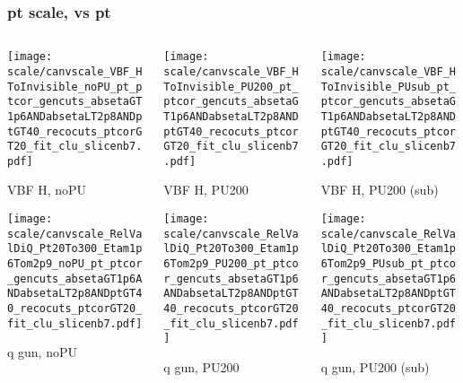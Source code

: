 \documentclass[8pt]{beamer}
\begin{document}
 \begin{frame}
  \frametitle{pt scale, vs pt}
  
  \begin{columns}
   \begin{column}{0.35\textwidth}
     \texttt{[image: scale/canvscale\_VBF\_HToInvisible\_noPU\_pt\_ptcor\_gencuts\_absetaGT1p6ANDabsetaLT2p8ANDptGT40\_recocuts\_ptcorGT20\_fit\_clu\_slicenb7.pdf]}
     
     VBF H, noPU
    
     \texttt{[image: scale/canvscale\_RelValDiQ\_Pt20To300\_Etam1p6Tom2p9\_noPU\_pt\_ptcor\_gencuts\_absetaGT1p6ANDabsetaLT2p8ANDptGT40\_recocuts\_ptcorGT20\_fit\_clu\_slicenb7.pdf]}
     
     q gun, noPU
   \end{column}
   \begin{column}{0.35\textwidth}
     \texttt{[image: scale/canvscale\_VBF\_HToInvisible\_PU200\_pt\_ptcor\_gencuts\_absetaGT1p6ANDabsetaLT2p8ANDptGT40\_recocuts\_ptcorGT20\_fit\_clu\_slicenb7.pdf]}
     
     VBF H, PU200
    
     \texttt{[image: scale/canvscale\_RelValDiQ\_Pt20To300\_Etam1p6Tom2p9\_PU200\_pt\_ptcor\_gencuts\_absetaGT1p6ANDabsetaLT2p8ANDptGT40\_recocuts\_ptcorGT20\_fit\_clu\_slicenb7.pdf]}
     
     q gun, PU200
   \end{column}
   \begin{column}{0.35\textwidth}
     \texttt{[image: scale/canvscale\_VBF\_HToInvisible\_PUsub\_pt\_ptcor\_gencuts\_absetaGT1p6ANDabsetaLT2p8ANDptGT40\_recocuts\_ptcorGT20\_fit\_clu\_slicenb7.pdf]}
     
     VBF H, PU200 (sub)
    
     \texttt{[image: scale/canvscale\_RelValDiQ\_Pt20To300\_Etam1p6Tom2p9\_PUsub\_pt\_ptcor\_gencuts\_absetaGT1p6ANDabsetaLT2p8ANDptGT40\_recocuts\_ptcorGT20\_fit\_clu\_slicenb7.pdf]}
     
     q gun, PU200 (sub)
   \end{column}
  \end{columns}
 \end{frame}
 
\end{document}
